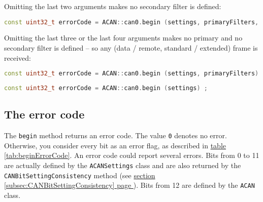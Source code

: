 \documentclass[10pt, a4paper, obeyspaces, openany]{extarticle}
\newcommand \subsectionLabel[2]{\subsection{#1}\label{subsec:#2}}
\newcommand\refSubsectionPage[1]{\hyperref[subsec:#1]{section \ref*{subsec:#1} page \pageref{subsec:#1}}}
\newcommand\refTableau[1]{\hyperref[tab:#1]{table \ref*{tab:#1}}}
\begin{document}
Omitting the last two arguments makes no secondary filter is defined:
{ \small\begin{lstlisting}[language=c++]
const uint32_t errorCode = ACAN::can0.begin (settings, primaryFilters, primaryFilterCount) ;
\end{lstlisting}}

Omitting the last three or the last four arguments makes no primary and no secondary filter is defined -- so any (data / remote, standard / extended) frame is received:
{ \small\begin{lstlisting}[language=c++]
const uint32_t errorCode = ACAN::can0.begin (settings, primaryFilters) ;
\end{lstlisting}}

{ \small\begin{lstlisting}[language=c++]
const uint32_t errorCode = ACAN::can0.begin (settings) ;
\end{lstlisting}}





\subsectionLabel{The error code}{errorCodeMethodBegin}

The \texttt{begin} method returns an error code. The value \texttt{0} denotes no error. Otherwise, you consider every bit as an error flag, as described in \refTableau{beginErrorCode}. An error code could report several errors. Bits from 0 to 11 are actually defined by the \texttt{ACANSettings} class and are also returned by the \texttt{CANBitSettingConsistency} method (see \refSubsectionPage{CANBitSettingConsistency}). Bits from 12 are defined by the \texttt{ACAN} class.
\end{document}
